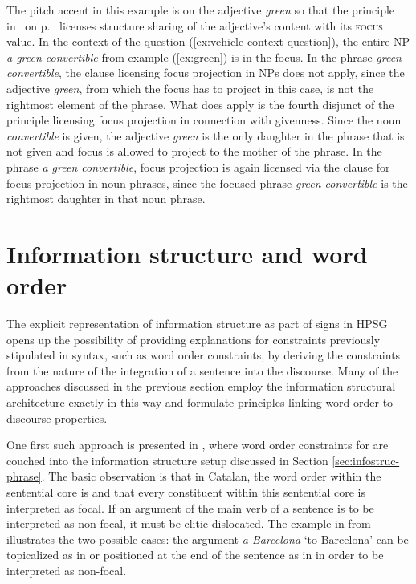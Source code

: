 \documentclass[output=paper]{langsci/langscibook}
\begin{document}
The pitch accent in this example is on the adjective \textit{green} so
that the principle in~ on p.~\pageref{fig:words} licenses structure
sharing of the adjective's content with its \textsc{focus} value. In
the context of the question (\ref{ex:vehicle-context-question}), the
entire NP \textit{a green convertible} from example (\ref{ex:green}) is
in the focus. In the phrase \textit{green convertible}, the clause
licensing focus projection in NPs does not apply, since the adjective
\textit{green}, from which the focus has to project in this case, is
not the rightmost element of the phrase.  What does apply is the
fourth disjunct of the principle licensing focus projection in
connection with givenness. Since the noun \textit{convertible} is
given, the adjective \textit{green} is the only daughter in the phrase
that is not given and focus is allowed to project to the mother of the
phrase. In the phrase \textit{a green convertible}, focus projection is
again licensed via the clause for focus projection in noun phrases,
since the focused phrase \textit{green convertible} is the rightmost
daughter in that noun phrase.


\section{Information structure and word order}
\label{sec:word-order}
The explicit representation of information structure as part of signs
in HPSG opens up the possibility of providing explanations for
constraints previously stipulated in syntax, such as word order
constraints, by deriving the constraints from the nature of the
integration of a sentence into the discourse. Many of the approaches
discussed in the previous section employ the information structural
architecture exactly in this way and formulate principles linking word
order to discourse properties.

One first such approach is presented in \cite{EV96a}, where word order
constraints for  are couched into the information
structure setup discussed in Section \ref{sec:infostruc-phrase}. The
basic observation is that in Catalan, the word order within the
sentential core is  and that every constituent within this
sentential core is interpreted as focal. If an argument of the main
verb of a sentence is to be interpreted as non-focal, it must be
clitic-dislocated. The example in  from \cite{EV96a}
illustrates the two possible cases: the argument \textit{a Barcelona}
`to Barcelona' can be topicalized as in  or positioned at
the end of the sentence as in  in order to be interpreted
as non-focal.
\end{document}
